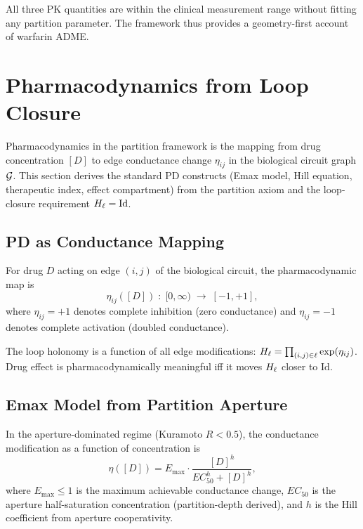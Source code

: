 All three PK quantities are within the clinical measurement range without
fitting any partition parameter.  The framework thus provides a geometry-first
account of warfarin ADME.

\section{Pharmacodynamics from Loop Closure}
\label{sec:ch09-pd-extended}

Pharmacodynamics in the partition framework is the mapping from drug
concentration $[D]$ to edge conductance change $\eta_{ij}$ in the biological
circuit graph $\mathcal{G}$.  This section derives the standard PD constructs
(Emax model, Hill equation, therapeutic index, effect compartment) from the
partition axiom and the loop-closure requirement $H_\ell = \mathrm{Id}$.

\subsection{PD as Conductance Mapping}
\label{subsec:ch09-pd-map}

\begin{definition}
\label{def:ch09-pd-map}
For drug $D$ acting on edge $(i,j)$ of the biological circuit, the
pharmacodynamic map is
\begin{equation}
  \eta_{ij}([D]) \;:\; [0,\infty) \;\longrightarrow\; [-1,+1],
  \label{eq:ch09-pd-map}
\end{equation}
where $\eta_{ij} = +1$ denotes complete inhibition (zero conductance) and
$\eta_{ij} = -1$ denotes complete activation (doubled conductance).
\end{definition}

The loop holonomy is a function of all edge modifications:
$H_\ell = \prod_{(i,j)\in\ell}\exp(\eta_{ij})$.  Drug effect is
pharmacodynamically meaningful iff it moves $H_\ell$ closer to $\mathrm{Id}$.

\subsection{Emax Model from Partition Aperture}
\label{subsec:ch09-emax}

\begin{theorem}
\label{thm:ch09-emax}
In the aperture-dominated regime (Kuramoto $R < 0.5$), the conductance
modification as a function of concentration is
\begin{equation}
  \eta([D]) = E_{\max}\cdot\frac{[D]^h}{EC_{50}^h + [D]^h},
  \label{eq:ch09-emax}
\end{equation}
where $E_{\max} \leq 1$ is the maximum achievable conductance change,
$EC_{50}$ is the aperture half-saturation concentration (partition-depth
derived), and $h$ is the Hill coefficient from aperture cooperativity.
\end{theorem}

